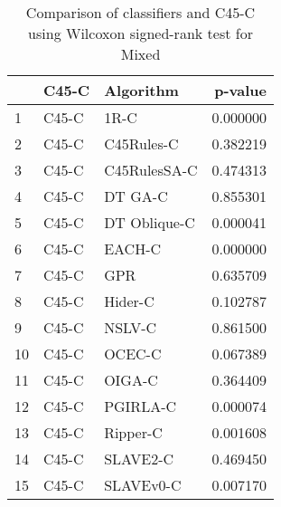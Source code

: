\begin{table}
\footnotesize
\caption{Comparison of classifiers and C45-C using Wilcoxon signed-rank test for Mixed}
\label{tab:C45-C wilcoxon Mixed comparison}
\begin{tabular}{lllr}
\hline
 & C45-C & Algorithm & p-value \\
\hline
1 & C45-C & 1R-C & 0.000000 \\
2 & C45-C & C45Rules-C & 0.382219 \\
3 & C45-C & C45RulesSA-C & 0.474313 \\
4 & C45-C & DT GA-C & 0.855301 \\
5 & C45-C & DT Oblique-C & 0.000041 \\
6 & C45-C & EACH-C & 0.000000 \\
7 & C45-C & GPR & 0.635709 \\
8 & C45-C & Hider-C & 0.102787 \\
9 & C45-C & NSLV-C & 0.861500 \\
10 & C45-C & OCEC-C & 0.067389 \\
11 & C45-C & OIGA-C & 0.364409 \\
12 & C45-C & PGIRLA-C & 0.000074 \\
13 & C45-C & Ripper-C & 0.001608 \\
14 & C45-C & SLAVE2-C & 0.469450 \\
15 & C45-C & SLAVEv0-C & 0.007170 \\
\hline
\end{tabular}
\end{table}
